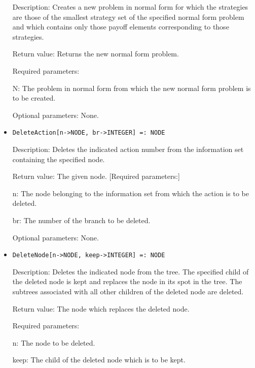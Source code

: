 \begin{itemize}
\bd
\item
[Description:] Creates a new problem in normal form for which the 
strategies are those of the smallest strategy set of the specified
normal form problem and which contains only those payoff elements 
corresponding to those strategies.
\item
[Return value:] Returns the new normal form problem.
\item
[Required parameters:]\hfil\null
	
\bd
\item
[ N:] The problem in normal form from which the new normal form
problem is to be created.
\ed

\item  
[Optional parameters:] None.
\ed

\item
\protect \large \begin{verbatim}
DeleteAction[n->NODE, br->INTEGER] =: NODE
\end{verbatim}\normalsize

\bd
\item
[Description:] Deletes the indicated action number from the information
set containing the specified node.
\item
[Return value:] The given node.
[Required parameters:]\hfil\null
	
\bd
\item
[ n:] The node belonging to the information set from which the action
is to be deleted.
\item [ br:] The number of the branch to be deleted.
\ed

\item
[Optional parameters:] None.
\ed

\item
\protect \large \begin{verbatim}
DeleteNode[n->NODE, keep->INTEGER] =: NODE
\end{verbatim}\normalsize

\bd
\item   
[Description:] Deletes the indicated node from the tree.  The specified
child of the deleted node is kept and replaces the node in its spot in
the tree.  The subtrees associated with all other children of the
deleted node are deleted.
\item
[Return value:] The node which replaces the deleted node.
\item
[Required parameters:]\hfil\null
	
\bd
\item
[ n:] The node to be deleted.
\item
[ keep:] The child of the deleted node which is to be kept.
\ed


\end{itemize}
